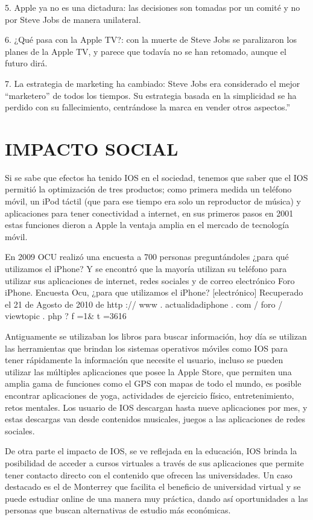 5. Apple ya no es una dictadura: las decisiones son tomadas
por un comité y no por Steve Jobs de manera unilateral.

6. ¿Qué pasa con la Apple TV?: con la muerte de Steve Jobs se
paralizaron los planes de la Apple TV, y parece que todavía no se
han retomado, aunque el futuro dirá.

7. La estrategia de marketing ha cambiado: Steve Jobs era
considerado el mejor “marketero” de todos los tiempos. Su
estrategia basada en la simplicidad se ha perdido con su
fallecimiento, centrándose la marca en vender otros aspectos.”

\section*{IMPACTO SOCIAL}

Si se sabe que efectos ha tenido IOS en el sociedad, tenemos
que saber que el IOS permitió la optimización de tres productos;
como primera medida un teléfono móvil, un iPod táctil (que para
ese tiempo era solo un reproductor de música) y aplicaciones
para tener conectividad a internet, en sus primeros pasos en
2001 estas funciones dieron a Apple la ventaja amplia en el
mercado de tecnología móvil.

En 2009 OCU realizó una encuesta a 700 personas
preguntándoles ¿para qué utilizamos el iPhone? Y se encontró
que la mayoría utilizan su teléfono para utilizar sus aplicaciones
de internet, redes sociales y de correo electrónico
Foro iPhone. Encuesta Ocu, ¿para que utilizamos el
iPhone? [electrónico] Recuperado el 21 de Agosto de 2010
de http :// www . actualidadiphone . com / foro / viewtopic . php ?
f =1\& t =3616

Antiguamente se utilizaban los libros para buscar información,
hoy día se utilizan las herramientas que brindan los sistemas
operativos móviles como IOS para tener rápidamente la
información que necesite el usuario, incluso se pueden utilizar
las múltiples aplicaciones que posee la Apple Store, que
permiten una amplia gama de funciones como el GPS con mapas
de todo el mundo, es posible encontrar aplicaciones de yoga,
actividades de ejercicio físico, entretenimiento, retos mentales.
Los usuario de IOS descargan hasta nueve aplicaciones por mes,
y estas descargas van desde contenidos musicales, juegos a las
aplicaciones de redes sociales.

De otra parte el impacto de IOS, se ve reflejada en la educación,
IOS brinda la posibilidad de acceder a cursos virtuales a través
de sus aplicaciones que permite tener contacto directo con el
contenido que ofrecen las universidades. Un caso destacado es
el de Monterrey que facilita el beneficio de universidad virtual y
se puede estudiar online de una manera muy práctica, dando así
oportunidades a las personas que buscan alternativas de estudio
más económicas.

